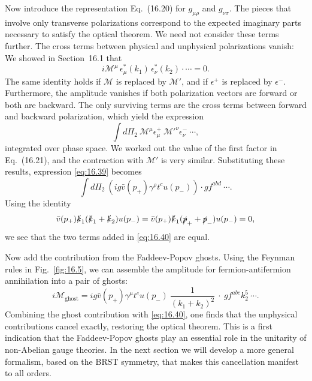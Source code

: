 Now introduce the representation Eq.~(16.20) for $g_{\mu\rho}$ and
$g_{\nu\sigma}$.  The pieces that involve only transverse polarizations
correspond to the expected imaginary parts necessary to satisfy the optical
theorem.  We need not consider these terms further.  The cross terms between
physical and unphysical polarizations vanish: We showed in Section~16.1 that
\begin{equation}
  i\mathcal{M}^\mu\,\epsilon^{*}_{\mu}(k_1)\,\epsilon^{*}_{\nu}(k_2)
    \cdot\cdots = 0 .
  \label{eq:16.38}
\end{equation}
The same identity holds if $\mathcal{M}$ is replaced by $\mathcal{M}'$, and
if $\epsilon^{+}$ is replaced by $\epsilon^{-}$.  Furthermore, the amplitude
vanishes if both polarization vectors are forward or both are backward.  The
only surviving terms are the cross terms between forward and backward
polarization, which yield the expression
\begin{equation}
  \int d\Pi_2\ \mathcal{M}^\mu\epsilon^{+}_{\mu}\ \mathcal{M}'^\nu
    \epsilon^{-}_{\nu}\ \cdots ,
  \label{eq:16.39}
\end{equation}
integrated over phase space.  We worked out the value of the first factor in
Eq.~(16.21), and the contraction with $\mathcal{M}'$ is very
similar.  Substituting these results, expression \eqref{eq:16.39} becomes
\begin{equation}
  \int d\Pi_2\ (ig\bar{v}(p_+)\gamma^\rho t^c u(p_-))\cdot g f^{abd}\ \cdots .
  \label{eq:16.40}
\end{equation}
Using the identity
\begin{equation}
  \bar{v}(p_+)\slashed{k}_1(\slashed{k}_1+\slashed{k}_2)u(p_-)
  = \bar{v}(p_+)\slashed{k}_1(\slashed{p}_+ + \slashed{p}_-)u(p_-) = 0 ,
  \label{eq:16.41}
\end{equation}
we see that the two terms added in \eqref{eq:16.40} are equal.

Now add the contribution from the Faddeev-Popov ghosts.  Using the Feynman
rules in Fig.~\ref{fig:16.5}, we can assemble the amplitude for
fermion-antifermion annihilation into a pair of ghosts:
\begin{equation}
  i\mathcal{M}_{\mathrm{ghost}} = ig\bar{v}(p_+)\gamma^\mu t^c u(p_-)\
    \frac{1}{(k_1+k_2)^2}\ \cdot\ gf^{abc}k^5_2\ \cdots .
  \label{eq:16.42}
\end{equation}
Combining the ghost contribution with \eqref{eq:16.40}, one finds that the
unphysical contributions cancel exactly, restoring the optical theorem.  This
is a first indication that the Faddeev-Popov ghosts play an essential role in
the unitarity of non-Abelian gauge theories.  In the next section we will
develop a more general formalism, based on the BRST symmetry, that makes this
cancellation manifest to all orders.


